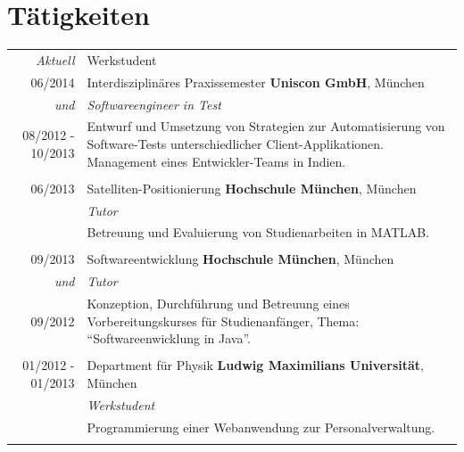 \documentclass[a4paper,10pt]{article} %
\begin{document}
\section{Tätigkeiten}
 
\begin{tabular}{r|p{11cm}}
 
\emph{Aktuell}             & Werkstudent \\
\textsc{06/2014}           & Interdisziplinäres Praxissemester \textbf{Uniscon GmbH}, München\\
\emph{und}		   & \emph{Softwareengineer in Test}\\
\textsc{08/2012 - 10/2013} & \small{Entwurf und Umsetzung von Strategien zur Automatisierung von Software-Tests unterschiedlicher Client-Applikationen. Management eines Entwickler-Teams in Indien.} \\
\multicolumn{2}{c}{} \\
 
 
\textsc{06/2013}           & Satelliten-Positionierung \textbf{Hochschule München}, München\\
                           & \emph{Tutor}\\
                           & \small{Betreuung und Evaluierung von Studienarbeiten in MATLAB.}\\
\multicolumn{2}{c}{} \\
 
 
\textsc{09/2013}           & Softwareentwicklung \textbf{Hochschule München}, München\\
\emph{und}                 & \emph{Tutor}\\
\textsc{09/2012}           & \small{Konzeption, Durchführung und Betreuung eines Vorbereitungskurses für Studienanfänger, Thema: ``Softwareenwicklung in Java''.}\\
\multicolumn{2}{c}{} \\
 
 
\textsc{01/2012 - 01/2013} & Department für Physik \textbf{Ludwig Maximilians Universität}, München\\
                           & \emph{Werkstudent}\\
                           & \small{Programmierung einer Webanwendung zur Personalverwaltung.}\\
\multicolumn{2}{c}{} \\
 

\end{tabular}
\end{document}
